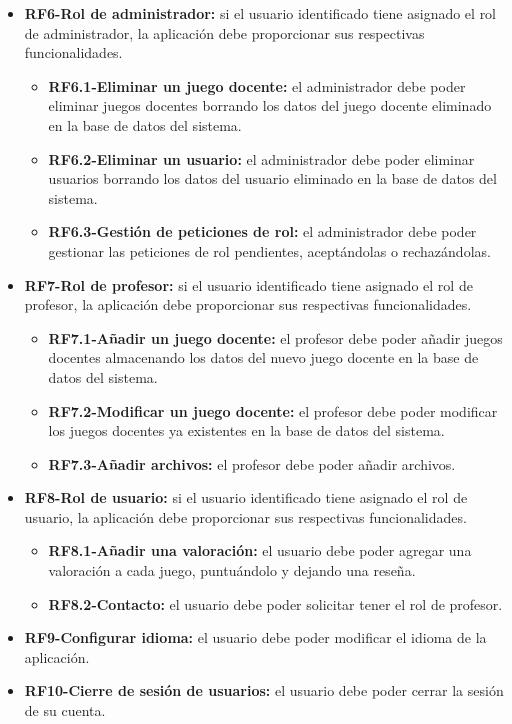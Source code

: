 \begin{itemize}
\begin{itemize}
        \end{itemize}
    \item \textbf{RF6-Rol de administrador:} si el usuario identificado tiene asignado el rol de administrador, la aplicación debe proporcionar sus respectivas funcionalidades.
        \begin{itemize}
        \tightlist
            \item \textbf{RF6.1-Eliminar un juego docente:} el administrador debe poder eliminar juegos docentes borrando los datos del juego docente eliminado en la base de datos del sistema.
            \item \textbf{RF6.2-Eliminar un usuario:} el administrador debe poder eliminar usuarios borrando los datos del usuario eliminado en la base de datos del sistema.
            \item \textbf{RF6.3-Gestión de peticiones de rol:} el administrador debe poder gestionar las peticiones de rol pendientes, aceptándolas o rechazándolas.
        \end{itemize}
    \item \textbf{RF7-Rol de profesor:} si el usuario identificado tiene asignado el rol de profesor, la aplicación debe proporcionar sus respectivas funcionalidades.
        \begin{itemize}
        \tightlist
            \item \textbf{RF7.1-Añadir un juego docente:} el profesor debe poder añadir juegos docentes almacenando los datos del nuevo juego docente en la base de datos del sistema.
            \item \textbf{RF7.2-Modificar un juego docente:} el profesor debe poder modificar los juegos docentes ya existentes en la base de datos del sistema.
            \item \textbf{RF7.3-Añadir archivos:} el profesor debe poder añadir archivos.
        \end{itemize}
    \item \textbf{RF8-Rol de usuario:}  si el usuario identificado tiene asignado el rol de usuario, la aplicación debe proporcionar sus respectivas funcionalidades.
         \begin{itemize}
        \tightlist
            \item \textbf{RF8.1-Añadir una valoración:} el usuario debe poder agregar una valoración a cada juego, puntuándolo y dejando una reseña.
            \item \textbf{RF8.2-Contacto:} el usuario debe poder solicitar tener el rol de profesor.
        \end{itemize}
        
    \item \textbf{RF9-Configurar idioma:} el usuario debe poder modificar el idioma de la aplicación.
    
    \item \textbf{RF10-Cierre de sesión de usuarios:} el usuario debe poder cerrar la sesión de su cuenta.
\end{itemize}

